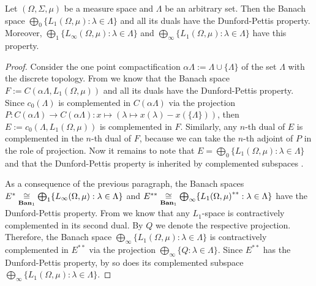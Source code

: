 \begin{proposition}\label{C0SumOfL1SpHaveDPP} Let $(\Omega, \Sigma, \mu)$ be a
measure space and $\Lambda$ be an arbitrary set. Then the Banach space
$\bigoplus_0 \{L_1(\Omega,\mu):\lambda\in\Lambda \}$ and all its duals have the
Dunford-Pettis property. Moreover, $\bigoplus_1
\{L_\infty(\Omega,\mu):\lambda\in\Lambda \}$ and $\bigoplus_\infty
\{L_1(\Omega,\mu):\lambda\in\Lambda \}$ have this property.
\end{proposition}
\begin{proof} Consider the one point compactification $\alpha\Lambda:=\Lambda\cup
\{\Lambda \}$ of the set $\Lambda$ with the discrete topology. From
\cite[corollary 7]{BourgOnTheDPP} we know 
that the Banach space $F:=C(\alpha\Lambda, L_1(\Omega, \mu))$ and all 
its duals have the Dunford-Pettis property. Since $c_0(\Lambda)$ is complemented 
in $C(\alpha\Lambda)$ via the projection 
$P:C(\alpha\Lambda)\to C(\alpha\Lambda):x\mapsto(\lambda\mapsto x(\lambda)-x( \{\Lambda \}))$, 
then $E:=c_0(\Lambda, L_1(\Omega,\mu))$ is complemented 
in $F$. Similarly, any $n$-th dual of $E$ is complemented in the $n$-th dual of $F$, 
because we can take the $n$-th adjoint of $P$ in the role of projection. 
Now it remains to note that $E=\bigoplus_0 \{L_1(\Omega,\mu):\lambda\in\Lambda \}$ 
and that the Dunford-Pettis property is inherited by complemented subspaces
\cite[proposition 13.44]{FabHabBanSpTh}. 

As a consequence of the previous paragraph, the Banach spaces
$E^*
\mathrel{\mathop{\cong}\limits_{\mathbf{Ban}_1}}
\bigoplus_1 \{
    L_\infty(\Omega,\mu):\lambda\in\Lambda
 \}$ 
and $E^{**}
\mathrel{\mathop{\cong}\limits_{\mathbf{Ban}_1}}
    \bigoplus_\infty \{{L_1(\Omega,\mu)}^{**}:\lambda\in\Lambda
 \}$ 
have the Dunford-Pettis property.
From \cite[proposition B10]{DefFloTensNorOpId} we know that any $L_1$-space is
contractively complemented in its second dual. By $Q$ we denote the respective
projection. Therefore, the Banach space $\bigoplus_\infty
\{L_1(\Omega,\mu):\lambda\in\Lambda \}$ is contractively complemented in
$E^{**}$ via the projection $\bigoplus_\infty  \{Q:\lambda\in\Lambda \}$. Since
$E^{**}$ has the Dunford-Pettis property, by \cite[proposition 13.44]{FabHabBanSpTh} so does its complemented 
subspace $\bigoplus_\infty \{L_1(\Omega,\mu):\lambda\in\Lambda \}$.
\end{proof}

